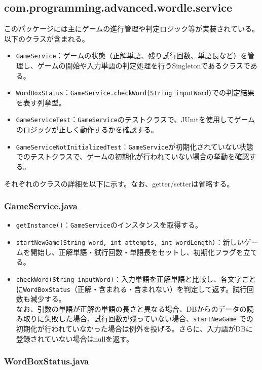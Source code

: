 \documentclass[a4j]{ujarticle}
\begin{document}
\subsection{com.programming.advanced.wordle.service}
このパッケージには主にゲームの進行管理や判定ロジック等が実装されている。以下のクラスが含まれる。
\begin{itemize}
  \item \texttt{GameService}：ゲームの状態（正解単語、残り試行回数、単語長など）を管理し、ゲームの開始や入力単語の判定処理を行うSingletonであるクラスである。
  \item \texttt{WordBoxStatus}：\texttt{GameService.checkWord(String inputWord)}での判定結果を表す列挙型。
  \item \texttt{GameServiceTest}：\texttt{GameService}のテストクラスで、JUnitを使用してゲームのロジックが正しく動作するかを確認する。
  \item \texttt{GameServiceNotInitializedTest}：\texttt{GameService}が初期化されていない状態でのテストクラスで、ゲームの初期化が行われていない場合の挙動を確認する。
\end{itemize}

それぞれのクラスの詳細を以下に示す。なお、getter/setterは省略する。
\subsubsection{GameService.java}

\begin{itemize}
  \item \texttt{getInstance()}：\texttt{GameService}のインスタンスを取得する。
  \item \texttt{startNewGame(String word, int attempts, int wordLength)}：新しいゲームを開始し、正解単語・試行回数・単語長をセットし、初期化フラグを立てる。
  \item \texttt{checkWord(String inputWord)}：入力単語を正解単語と比較し、各文字ごとに\texttt{WordBoxStatus}（正解・含まれる・含まれない）を判定して返す。試行回数も減少する。\\
  なお、引数の単語が正解の単語の長さと異なる場合、DBからのデータの読み取りに失敗した場合、試行回数が残っていない場合、\texttt{startNewGame} での初期化が行われていなかった場合は例外を投げる。さらに、入力語がDBに登録されていない場合はnullを返す。
\end{itemize}

\subsubsection{WordBoxStatus.java}
\end{document}
